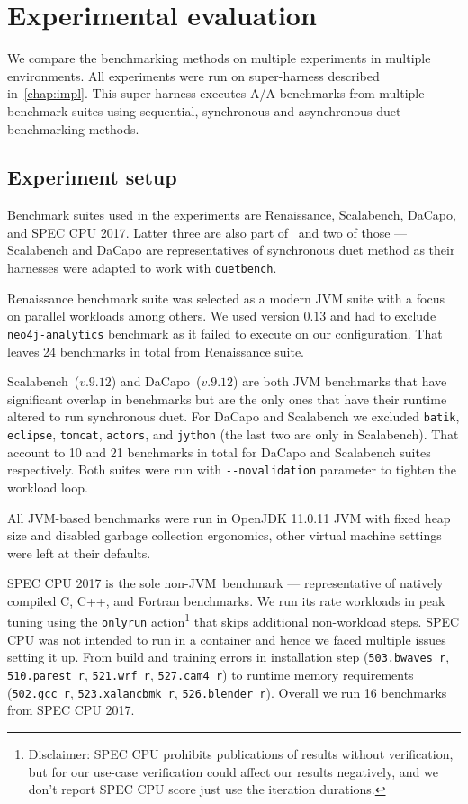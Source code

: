 \chapter{Experimental evaluation}
\label{chap:evaluation}

We compare the benchmarking methods on multiple experiments in multiple environments.
All experiments were run on super-harness described in~\cref{chap:impl}.
This super harness executes A/A benchmarks from multiple benchmark suites using sequential, synchronous and asynchronous duet benchmarking methods.

\section{Experiment setup}
\label{sec:experiment_setup}

Benchmark suites used in the experiments are Renaissance, Scalabench, DaCapo, and SPEC CPU 2017.
Latter three are also part of~\citet{bulej2020duet} and two of those --- Scalabench and DaCapo are representatives of synchronous duet method as their harnesses were adapted to work with \lstinline{duetbench}.

Renaissance benchmark suite was selected as a modern JVM suite with a focus on parallel workloads among others\cite{prokopec2019renaissance}.
We used version $0.13$ and had to exclude \lstinline{neo4j-analytics} benchmark as it failed to execute on our configuration.
That leaves 24 benchmarks in total from Renaissance suite.

Scalabench~($v.9.12$) and DaCapo~($v.9.12$) are both JVM benchmarks that have significant overlap in benchmarks but are the only ones that have their runtime altered to run synchronous duet.
For DaCapo and Scalabench we excluded \lstinline{batik}, \lstinline{eclipse}, \lstinline{tomcat}, \lstinline{actors}, and \lstinline{jython} (the last two are only in Scalabench).
That account to 10 and 21 benchmarks in total for DaCapo and Scalabench suites respectively.
Both suites were run with \lstinline{--novalidation} parameter to tighten the workload loop.

All \mbox{JVM-based} benchmarks were run in OpenJDK 11.0.11 JVM with fixed heap size and disabled garbage collection ergonomics, other virtual machine settings were left at their defaults.

SPEC CPU 2017 is the sole \mbox{non-JVM benchmark} --- representative of natively compiled C, C++, and Fortran benchmarks.
We run its rate workloads in peak tuning using the \lstinline{onlyrun} action\footnote{
	Disclaimer: SPEC CPU prohibits publications of results without verification, but for our use-case verification could affect our results negatively, and we don't report SPEC CPU score just use the iteration durations.}
that skips additional non-workload steps.
SPEC CPU was not intended to run in a container and hence we faced multiple issues setting it up.
From build and training errors in installation step (\lstinline{503.bwaves_r}, \lstinline{510.parest_r}, \lstinline{521.wrf_r}, \lstinline{527.cam4_r}) to runtime memory requirements (\lstinline{502.gcc_r}, \lstinline{523.xalancbmk_r}, \lstinline{526.blender_r}).
Overall we run 16 benchmarks from SPEC CPU 2017.

